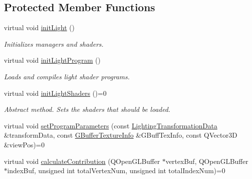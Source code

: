 \subsection*{Protected Member Functions}
\begin{DoxyCompactItemize}
\item 
\mbox{\label{class_geometry_engine_1_1_geometry_world_item_1_1_geometry_light_1_1_light_ab3be1e49344f033c893120a3de792b46}} 
virtual void \mbox{\hyperlink{class_geometry_engine_1_1_geometry_world_item_1_1_geometry_light_1_1_light_ab3be1e49344f033c893120a3de792b46}{init\+Light}} ()
\begin{DoxyCompactList}\small\item\em Initializes managers and shaders. \end{DoxyCompactList}\item 
\mbox{\label{class_geometry_engine_1_1_geometry_world_item_1_1_geometry_light_1_1_light_a199c45f95482b66a0b5b45c5fdecb2e7}} 
virtual void \mbox{\hyperlink{class_geometry_engine_1_1_geometry_world_item_1_1_geometry_light_1_1_light_a199c45f95482b66a0b5b45c5fdecb2e7}{init\+Light\+Program}} ()
\begin{DoxyCompactList}\small\item\em Loads and compiles light shader programs. \end{DoxyCompactList}\item 
\mbox{\label{class_geometry_engine_1_1_geometry_world_item_1_1_geometry_light_1_1_light_a7bcd2133b4b691496691148e73c5411b}} 
virtual void \mbox{\hyperlink{class_geometry_engine_1_1_geometry_world_item_1_1_geometry_light_1_1_light_a7bcd2133b4b691496691148e73c5411b}{init\+Light\+Shaders}} ()=0
\begin{DoxyCompactList}\small\item\em Abstract method. Sets the shaders that should be loaded. \end{DoxyCompactList}\item 
virtual void \mbox{\hyperlink{class_geometry_engine_1_1_geometry_world_item_1_1_geometry_light_1_1_light_a366be5945389fe58df4bf5aa8c43138f}{set\+Program\+Parameters}} (const \mbox{\hyperlink{struct_geometry_engine_1_1_lighting_transformation_data}{Lighting\+Transformation\+Data}} \&transform\+Data, const \mbox{\hyperlink{struct_geometry_engine_1_1_g_buffer_texture_info}{G\+Buffer\+Texture\+Info}} \&G\+Buff\+Tex\+Info, const Q\+Vector3D \&view\+Pos)=0
\item 
virtual void \mbox{\hyperlink{class_geometry_engine_1_1_geometry_world_item_1_1_geometry_light_1_1_light_a58aa2a3520f7aa2b03afcb4123e7530a}{calculate\+Contribution}} (Q\+Open\+G\+L\+Buffer $\ast$vertex\+Buf, Q\+Open\+G\+L\+Buffer $\ast$index\+Buf, unsigned int total\+Vertex\+Num, unsigned int total\+Index\+Num)=0
\end{DoxyCompactItemize}
